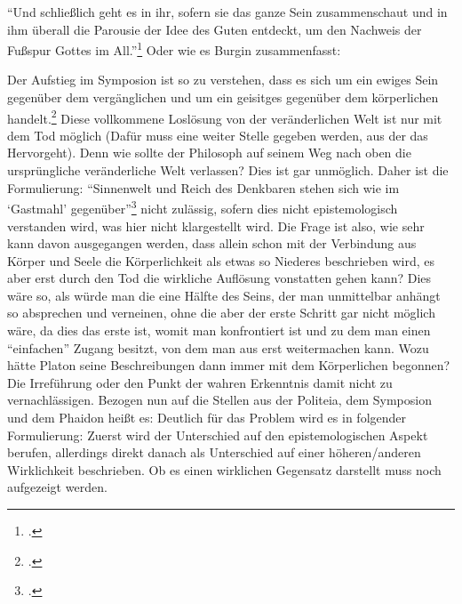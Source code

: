 \enquote{Und schließlich geht es in ihr, sofern sie das ganze Sein zusammenschaut und in ihm überall die Parousie der Idee des Guten entdeckt, um den Nachweis der Fußspur Gottes im All.}\footcite[][S. 107]{Hirschberger}
Oder wie es Burgin zusammenfasst: 
\vspace{3cm}

Der Aufstieg im Symposion ist so zu verstehen, dass es sich um ein ewiges Sein gegenüber dem vergänglichen und um ein geisitges gegenüber dem körperlichen handelt.\footcite[vgl.][S. 27f.]{DisseMetaphysik}  Diese vollkommene Loslösung von der veränderlichen Welt ist nur mit dem Tod möglich (Dafür muss eine weiter Stelle gegeben werden, aus der das Hervorgeht). Denn wie sollte der Philosoph auf seinem Weg nach oben die ursprüngliche veränderliche Welt verlassen? Dies ist gar unmöglich. Daher ist die Formulierung: \enquote{Sinnenwelt und Reich des Denkbaren stehen sich wie im \enquote{Gastmahl} gegenüber}\footcite[][S. 28]{DisseMetaphysik} nicht zulässig, sofern dies nicht epistemologisch verstanden wird, was hier nicht klargestellt wird.
Die Frage ist also, wie sehr kann davon ausgegangen werden, dass allein schon mit der Verbindung aus Körper und Seele die Körperlichkeit als etwas so Niederes beschrieben wird, es aber erst durch den Tod die wirkliche Auflösung vonstatten gehen kann? Dies wäre so, als würde man die eine Hälfte des Seins, der man unmittelbar anhängt so absprechen und verneinen, ohne die aber der erste Schritt gar nicht möglich wäre, da dies das erste ist, womit man konfrontiert ist und zu dem man einen \enquote{einfachen} Zugang besitzt, von dem man aus erst weitermachen kann. Wozu hätte Platon seine Beschreibungen dann immer mit dem Körperlichen begonnen? Die Irreführung oder den Punkt der wahren Erkenntnis damit nicht zu vernachlässigen.
Bezogen nun auf die Stellen aus der Politeia, dem Symposion und dem Phaidon heißt es:
Deutlich für das Problem wird es in folgender Formulierung:  Zuerst wird der Unterschied auf den epistemologischen Aspekt berufen, allerdings direkt danach als Unterschied auf einer höheren/anderen Wirklichkeit beschrieben. Ob es einen wirklichen Gegensatz darstellt muss noch aufgezeigt werden.

